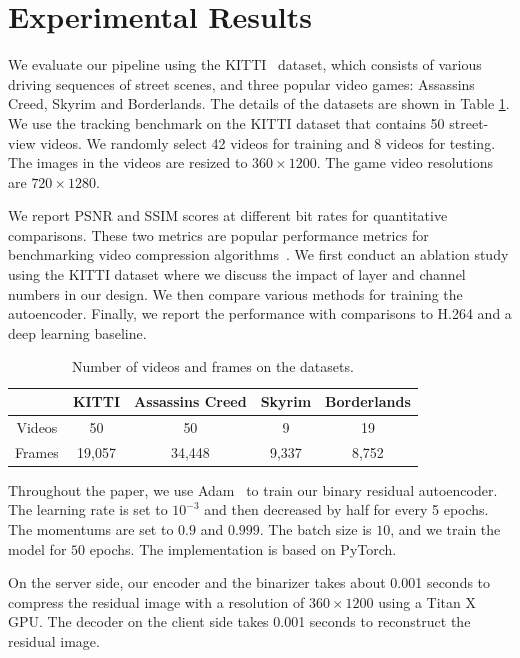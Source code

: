 \documentclass[letterpaper]{article} %
\begin{document}
	\section{Experimental Results}

	We evaluate our pipeline using the KITTI~\cite{Geiger_CVPR_2012} dataset, which consists of various driving sequences of street scenes, and three popular video games: Assassins Creed, Skyrim and Borderlands. The details of the datasets are shown in Table \ref{tab:dataset}. We use the tracking benchmark on the KITTI dataset that contains 50 street-view videos. We randomly select 42 videos for training and 8 videos for testing. The images in the videos are resized to $360 \times 1200$. The game video resolutions are $720 \times 1280$.

	We report PSNR and SSIM scores at different bit rates for quantitative comparisons. These two metrics are popular performance metrics for benchmarking video compression algorithms~\cite{Wang_TIP_2004}. We first conduct an ablation study using the KITTI dataset where we discuss the impact of layer and channel numbers in our design. We then compare various methods for training the autoencoder. Finally, we report the performance with comparisons to H.264 and a deep learning baseline.
	\begin{table}[t]
		\caption{Number of videos and frames on the datasets.
		}
		\small
		\centering
		\begin{tabular}{ccccc}
			\toprule
			& KITTI & Assassins Creed & Skyrim & Borderlands \\
			\hline

			Videos & 50 & 50 & 9 & 19 \\
			\hline

			Frames & 19,057 & 34,448 & 9,337 & 8,752\\
			\bottomrule
		\end{tabular}
		\label{tab:dataset}
	\end{table}
	{} Throughout the paper, we use Adam~\cite{Kingma_ICLR_2015} to train our binary residual autoencoder. The learning rate is set to $10^{-3}$ and then decreased by half for every 5 epochs. The momentums are set to $0.9$ and $0.999$. The batch size is $10$, and we train the model for $50$ epochs. The implementation is based on PyTorch.

	{} On the server side, our encoder and the binarizer takes about 0.001 seconds to compress the residual image with a resolution of $360 \times 1200$ using a Titan X GPU. The decoder on the client side takes 0.001 seconds to reconstruct the residual image. %
\end{document}
